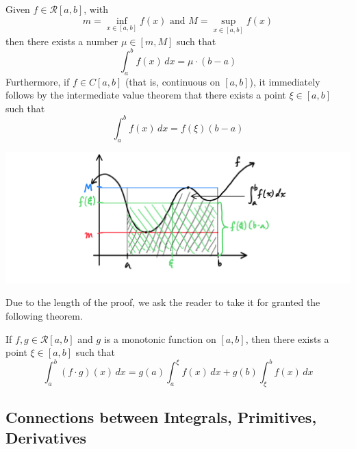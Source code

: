 \documentclass{article}
\begin{document}
      \begin{theorem}
      Given $f \in \mathcal{R}[a, b]$, with 
      \[m = \inf_{x \in [a, b]} f(x) \text{ and } M = \sup_{x \in [a, b]} f(x)\]
      then there exists a number $\mu \in [m, M]$ such that
      \[\int_a^b f(x)\,dx = \mu \cdot (b - a)\]
      Furthermore, if $f \in C[a, b]$ (that is, continuous on $[a, b]$), it immediately follows by the intermediate value theorem that there exists a point $\xi \in [a, b]$ such that
      \[\int_a^b f(x)\,dx = f(\xi) (b - a)\]
      \begin{center}
          \includegraphics[scale=0.27]{img/Mean_Plus_Intermediate_Value_Theorem_Integral.PNG}
      \end{center}
      \end{theorem}

      Due to the length of the proof, we ask the reader to take it for granted the following theorem. 

      \begin{theorem}
      If $f, g \in \mathcal{R}[a, b]$ and $g$ is a monotonic function on $[a, b]$, then there exists a point $\xi \in [a, b]$ such that
      \[\int_a^b (f \cdot g) (x)\,dx = g(a) \int_a^\xi f(x)\,dx + g(b) \int_\xi^b f(x)\,dx\]
      \end{theorem}

    \subsection{Connections between Integrals, Primitives, Derivatives}
\end{document}
